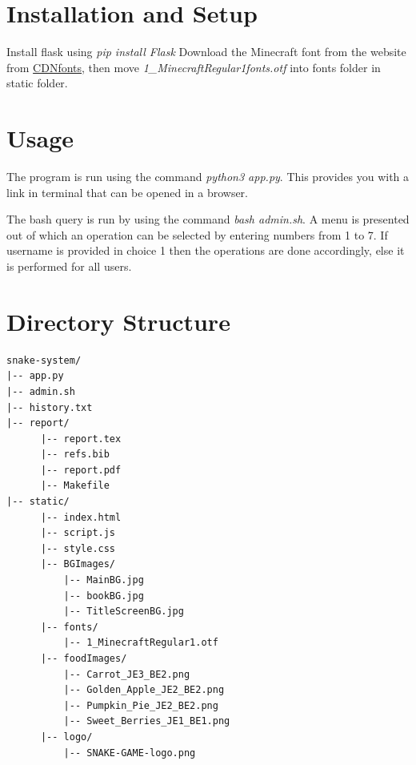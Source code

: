 \documentclass[12pt, letterpaper]{article}
\begin{document}
\section{Installation and Setup}
Install flask using \textit{pip install Flask}
Download the Minecraft font from the website from \href{https://www.cdnfonts.com/minecraft-3.font}{CDNfonts}\cite{fonts-website}, then move \textit{1\_MinecraftRegular1fonts.otf} into fonts folder in static folder. 

\section{Usage}

The program is run using the command \textit{python3 app.py}. This provides you with a link in terminal that can be opened in a browser. 

The bash query is run by using the command \textit{bash admin.sh}. A menu is presented out of which an operation can be selected by entering numbers from 1 to 7. If username is provided in choice 1 then the operations are done accordingly, else it is performed for all users.


\section{Directory Structure}

\clearpage
\begin{verbatim}
snake-system/
|-- app.py
|-- admin.sh
|-- history.txt
|-- report/
      |-- report.tex
      |-- refs.bib
      |-- report.pdf
      |-- Makefile
|-- static/
      |-- index.html
      |-- script.js
      |-- style.css
      |-- BGImages/
          |-- MainBG.jpg
          |-- bookBG.jpg
          |-- TitleScreenBG.jpg
      |-- fonts/
          |-- 1_MinecraftRegular1.otf
      |-- foodImages/
          |-- Carrot_JE3_BE2.png
          |-- Golden_Apple_JE2_BE2.png
          |-- Pumpkin_Pie_JE2_BE2.png
          |-- Sweet_Berries_JE1_BE1.png
      |-- logo/
          |-- SNAKE-GAME-logo.png
\end{verbatim}
\end{document}
